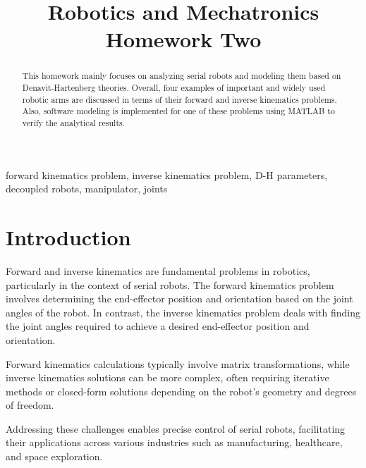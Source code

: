 \documentclass[conference]{IEEEtran}
\begin{document}
\title{Robotics and Mechatronics\\
{\LARGE Homework Two}
}

\author{
}

\maketitle

\begin{abstract}
    This homework mainly focuses on analyzing serial robots and modeling them based on Denavit-Hartenberg theories. Overall, four examples of important and widely used robotic arms are discussed in terms of their forward and inverse kinematics problems. Also, software modeling is implemented for one of these problems using MATLAB to verify the analytical results.
\end{abstract}

\begin{IEEEkeywords}
    forward kinematics problem, inverse kinematics problem, D-H parameters, decoupled robots, manipulator, joints
\end{IEEEkeywords}

\section{Introduction}
Forward and inverse kinematics are fundamental problems in robotics, particularly in the context of serial robots. The forward kinematics problem involves determining the end-effector position and orientation based on the joint angles of the robot. In contrast, the inverse kinematics problem deals with finding the joint angles required to achieve a desired end-effector position and orientation.

Forward kinematics calculations typically involve matrix transformations, while inverse kinematics solutions can be more complex, often requiring iterative methods or closed-form solutions depending on the robot's geometry and degrees of freedom.

Addressing these challenges enables precise control of serial robots, facilitating their applications across various industries such as manufacturing, healthcare, and space exploration.
\end{document}
